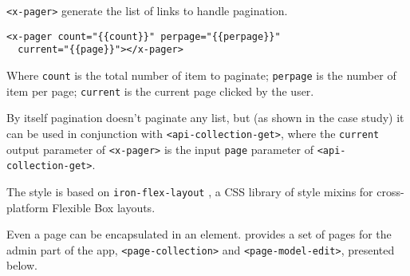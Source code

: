 \vspace{0.2cm}

\texttt{<x-pager>} generate the list of links to handle pagination.

\begin{lstlisting}[language=HTML5]
<x-pager count="{{count}}" perpage="{{perpage}}"
  current="{{page}}"></x-pager>
\end{lstlisting}

Where \texttt{count} is the total number of item to paginate; 
\texttt{perpage} is the number of item per page; 
\texttt{current} is the current page clicked by the user.

By itself pagination doesn't paginate any list, but (as shown in the case study) it can be used in conjunction with \texttt{<api-collection-get>}, where the \texttt{current} output parameter of \texttt{<x-pager>} is the input \texttt{page} parameter of \texttt{<api-collection-get>}.

\vspace{0.2cm}

The style is based on \texttt{iron-flex-layout} \cite{iron-elements}, a CSS library of style mixins for cross-platform Flexible Box \cite{css-flexbox} layouts.

\vspace{0.2cm}

Even a page can be encapsulated in an element.  provides a set of pages for the admin part of the app, \texttt{<page-collection>} and \texttt{<page-model-edit>}, presented below.


